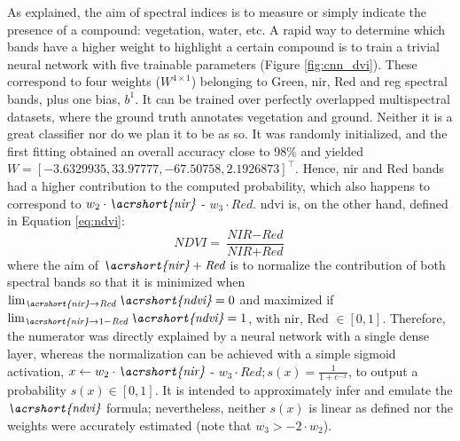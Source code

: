 \begin{kaobox}[frametitle=Activation of relevant spectral bands]
As explained, the aim of spectral indices is to measure or simply indicate the presence of a compound: vegetation, water, etc. A rapid way to determine which bands have a higher weight to highlight a certain compound is to train a trivial neural network with five trainable parameters (Figure \ref{fig:cnn_dvi}). These correspond to four weights ($W^{4\times1}$) belonging to Green, \acrshort{nir}, Red and \acrshort{reg} spectral bands, plus one bias, $b^{1}$. It can be trained over perfectly overlapped multispectral datasets, where the ground truth annotates vegetation and ground. Neither it is a great classifier nor do we plan it to be as so. It was randomly initialized, and the first fitting obtained an overall accuracy close to 98\% and yielded $W = \left[-3.6329935, 33.97777, -67.50758, 2.1926873\right]^{\intercal}$. Hence, \acrshort{nir} and Red bands had a higher contribution to the computed probability, which also happens to correspond to $w_2 \cdot \textit{\acrshort{nir}}$ - $w_3 \cdot \textit{Red}$. \acrshort{ndvi} is, on the other hand, defined in Equation \ref{eq:ndvi}:
\begin{equation}
    \textit{NDVI} = \frac{\textit{NIR} - \textit{Red}}{\textit{NIR} + \textit{Red}}
    \label{eq:ndvi}
\end{equation}
where the aim of $\textit{\acrshort{nir}} + \textit{Red}$ is to normalize the contribution of both spectral bands so that it is minimized when $\lim_{\textit{\acrshort{nir}} \to \textit{Red}} \textit{\acrshort{ndvi}} = 0$ and maximized if $\lim_{\textit{\acrshort{nir}} \to 1 - \textit{Red}} \textit{\acrshort{ndvi}} = 1$, with \acrshort{nir}, Red $\in [0, 1]$. Therefore, the numerator was directly explained by a neural network with a single dense layer, whereas the normalization can be achieved with a simple sigmoid activation, $x \gets w_2 \cdot \textit{\acrshort{nir}}$ - $w_3 \cdot \textit{Red}; s(x) =  \frac{1}{1 + e^{-x}}$, to output a probability $s(x) \in [0, 1]$. It is intended to approximately infer and emulate the $\textit{\acrshort{ndvi}}$ formula; nevertheless, neither $s(x)$ is linear as defined nor the weights were accurately estimated (note that $w_3 > -2 \cdot w_2$).  
\end{kaobox}

